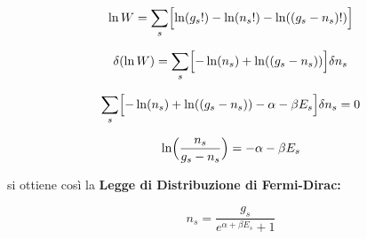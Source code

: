 \begin{enumerate}[label=\Roman*]
$$ \ln W = \sum_s \Bigl[  \ln (g_s!) - \ln (n_s!) - \ln ((g_s - n_s)!)   \Bigr] $$

$$ \delta (\ln W) = \sum_s  \Bigl[ - \ln (n_s) + \ln ((g_s - n_s))   \Bigr]  \delta n_s $$

$$  \sum_s  \Bigl[  - \ln (n_s) + \ln ((g_s - n_s)) - \alpha - \beta E_s \Bigr]  \delta n_s = 0  $$

$$  \ln \Bigl( \frac{n_s}{g_s - n_s}  \Bigr) = - \alpha - \beta E_s  $$

si ottiene così la \textbf{Legge di Distribuzione di Fermi-Dirac:}

$$ n_s = \frac{g_s}{ e^{\alpha + \beta E_s} + 1 } $$


\end{enumerate}



